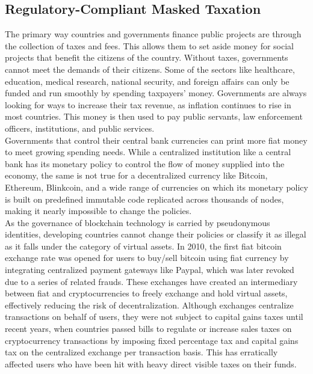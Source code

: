 \documentclass[letterpaper,11pt]{article}
\begin{document}
\subsection{Regulatory-Compliant Masked Taxation}

The primary way countries and governments finance public projects are through the collection of taxes and fees. This allows them to set aside money for social projects that benefit the citizens of the country. Without taxes, governments cannot meet the demands of their citizens. Some of the sectors like healthcare, education, medical research, national security, and foreign affairs can only be funded and run smoothly by spending taxpayers' money. Governments are always looking for ways to increase their tax revenue, as inflation continues to rise in most countries. This money is then used to pay public servants, law enforcement officers, institutions, and public services.\\

Governments that control their central bank currencies can print more fiat money to meet growing spending needs. While a centralized institution like a central bank has its monetary policy to control the flow of money supplied into the economy,  the same is not true for a decentralized currency like Bitcoin, Ethereum, Blinkcoin, and a wide range of currencies on which its monetary policy is built on predefined immutable code replicated across thousands of nodes, making it nearly impossible to change the policies.\\

As the governance of blockchain technology is carried by pseudonymous identities, developing countries cannot change their policies or classify it as illegal as it falls under the category of virtual assets. In 2010, the first fiat bitcoin exchange rate was opened for users to buy/sell bitcoin using fiat currency by integrating centralized payment gateways like Paypal, which was later revoked due to a series of related frauds. These exchanges have created an intermediary between fiat and cryptocurrencies to freely exchange and hold virtual assets, effectively reducing the risk of decentralization. Although exchanges centralize transactions on behalf of users, they were not subject to capital gains taxes until recent years, when countries passed bills to regulate or increase sales taxes on cryptocurrency transactions by imposing fixed percentage tax and capital gains tax on the centralized exchange per transaction basis. This has erratically affected users who have been hit with heavy direct visible taxes on their funds.\\
\end{document}
